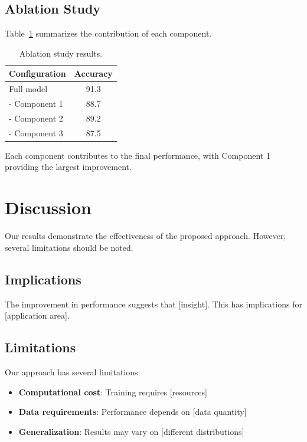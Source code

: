 \documentclass[conference]{IEEEtran}
\theoremstyle{plain}
\theoremstyle{definition}
\begin{document}
\subsection{Ablation Study}

Table~\ref{tab:ablation} summarizes the contribution of each component.

\begin{table}[htbp]
\caption{Ablation study results.}
\label{tab:ablation}
\begin{center}
\begin{tabular}{|l|c|}
\hline
\textbf{Configuration} & \textbf{Accuracy} \\
\hline
Full model & 91.3 \\
- Component 1 & 88.7 \\
- Component 2 & 89.2 \\
- Component 3 & 87.5 \\
\hline
\end{tabular}
\end{center}
\end{table}

Each component contributes to the final performance, with Component 1
providing the largest improvement.

\section{Discussion}
\label{sec:discussion}

Our results demonstrate the effectiveness of the proposed approach.
However, several limitations should be noted.

\subsection{Implications}

The improvement in performance suggests that [insight]. This has
implications for [application area].

\subsection{Limitations}

Our approach has several limitations:
\begin{itemize}
  \item \textbf{Computational cost}: Training requires [resources]
  \item \textbf{Data requirements}: Performance depends on [data quantity]
  \item \textbf{Generalization}: Results may vary on [different distributions]
\end{itemize}
\end{document}
